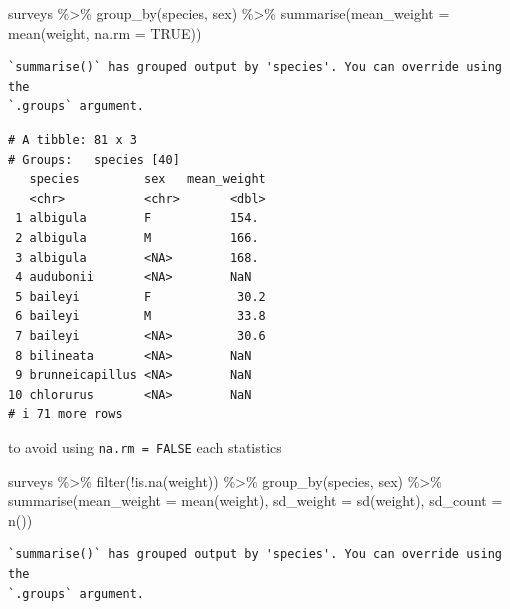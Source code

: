 \documentclass[
  letterpaper,
  DIV=11,
  numbers=noendperiod]{scrreprt}
\newenvironment{Shaded}{\begin{snugshade}}{\end{snugshade}}
\newcommand{\AttributeTok}[1]{\textcolor[rgb]{0.40,0.45,0.13}{#1}}
\newcommand{\ConstantTok}[1]{\textcolor[rgb]{0.56,0.35,0.01}{#1}}
\newcommand{\FunctionTok}[1]{\textcolor[rgb]{0.28,0.35,0.67}{#1}}
\newcommand{\NormalTok}[1]{\textcolor[rgb]{0.00,0.23,0.31}{#1}}
\newcommand{\SpecialCharTok}[1]{\textcolor[rgb]{0.37,0.37,0.37}{#1}}
\begin{document}
\begin{Shaded}
\begin{Highlighting}[]
\NormalTok{surveys }\SpecialCharTok{\%\textgreater{}\%}
  \FunctionTok{group\_by}\NormalTok{(species, sex) }\SpecialCharTok{\%\textgreater{}\%}
  \FunctionTok{summarise}\NormalTok{(}\AttributeTok{mean\_weight =} \FunctionTok{mean}\NormalTok{(weight, }\AttributeTok{na.rm =} \ConstantTok{TRUE}\NormalTok{))}
\end{Highlighting}
\end{Shaded}

\begin{verbatim}
`summarise()` has grouped output by 'species'. You can override using the
`.groups` argument.
\end{verbatim}

\begin{verbatim}
# A tibble: 81 x 3
# Groups:   species [40]
   species         sex   mean_weight
   <chr>           <chr>       <dbl>
 1 albigula        F           154. 
 2 albigula        M           166. 
 3 albigula        <NA>        168. 
 4 audubonii       <NA>        NaN  
 5 baileyi         F            30.2
 6 baileyi         M            33.8
 7 baileyi         <NA>         30.6
 8 bilineata       <NA>        NaN  
 9 brunneicapillus <NA>        NaN  
10 chlorurus       <NA>        NaN  
# i 71 more rows
\end{verbatim}

to avoid using \texttt{na.rm\ =\ FALSE} each statistics

\begin{Shaded}
\begin{Highlighting}[]
\NormalTok{surveys }\SpecialCharTok{\%\textgreater{}\%}
  \FunctionTok{filter}\NormalTok{(}\SpecialCharTok{!}\FunctionTok{is.na}\NormalTok{(weight)) }\SpecialCharTok{\%\textgreater{}\%}
  \FunctionTok{group\_by}\NormalTok{(species, sex) }\SpecialCharTok{\%\textgreater{}\%}
  \FunctionTok{summarise}\NormalTok{(}\AttributeTok{mean\_weight =} \FunctionTok{mean}\NormalTok{(weight), }\AttributeTok{sd\_weight =} \FunctionTok{sd}\NormalTok{(weight), }\AttributeTok{sd\_count =} \FunctionTok{n}\NormalTok{())}
\end{Highlighting}
\end{Shaded}

\begin{verbatim}
`summarise()` has grouped output by 'species'. You can override using the
`.groups` argument.
\end{verbatim}
\end{document}
